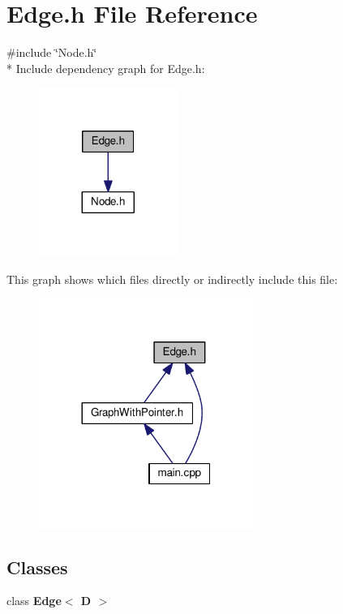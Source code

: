 \section{Edge.\-h File Reference}
\label{_edge_8h}
{\ttfamily \#include \char`\"{}Node.\-h\char`\"{}}\\*
Include dependency graph for Edge.\-h\-:
\nopagebreak
\begin{figure}[H]
\begin{center}
\leavevmode
\includegraphics[width=128pt]{_edge_8h__incl}
\end{center}
\end{figure}
This graph shows which files directly or indirectly include this file\-:
\nopagebreak
\begin{figure}[H]
\begin{center}
\leavevmode
\includegraphics[width=197pt]{_edge_8h__dep__incl}
\end{center}
\end{figure}
\subsection*{Classes}
\begin{DoxyCompactItemize}
\item 
class {\bf Edge$<$ D $>$}
\end{DoxyCompactItemize}
